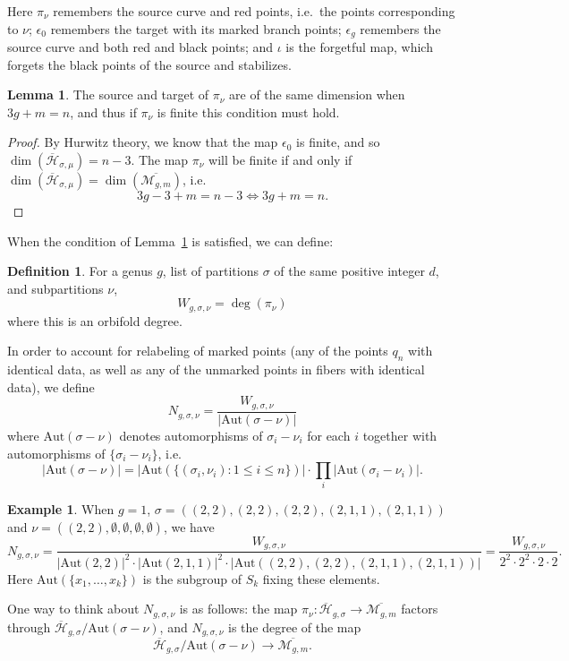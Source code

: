 \documentclass[thesis]{thesis-umich}           %
\newcommand{\Aut}{\text{Aut}}
\newcommand{\Hb}{\overline{\mathcal H}}
\theoremstyle{definition}
\newtheorem{dfn}[thm]{Definition}
\newtheorem{lem}[thm]{Lemma}
\newtheorem{eg}[thm]{Example}
\begin{document}
Here $\pi_{\nu}$ remembers the source curve and red points, i.e.\ the points corresponding to $\nu$; $\epsilon_0$ remembers the target with its marked
branch points; $\epsilon_g$ remembers the source curve and both red
and black points; and $\iota$ is the forgetful map, which forgets
the black points of the source and stabilizes.

\begin{lem}
  \label{lem:dim}
  The source and target of $\pi_{\nu}$ are of the same dimension when $3g+m=n$,
  and thus if $\pi_{\nu}$ is finite this condition must hold.
\end{lem}
\begin{proof}
  By Hurwitz theory, we know that the map $\epsilon_0$ is finite, and so $\dim(\Hb_{\sigma,\mu})=n-3$. The map $\pi_{\nu}$ will be finite if and only if
  $\dim(\Hb_{\sigma,\mu})=\dim(\overline{\mathcal M_{g,m}})$, i.e.
  \[
  3g-3+m=n-3\iff 3g+m=n.
  \]
  \end{proof}

When the condition of Lemma~\ref{lem:dim} is satisfied, we can define:
\begin{dfn}
  For a genus $g$, list of partitions $\sigma$ of the
  same positive integer $d$, and subpartitions $\nu$,
\[
W_{g,\sigma,\nu}=\deg(\pi_{\nu})
\]
where this is an orbifold degree.
\end{dfn}
In order to account for relabeling of marked points (any of the points $q_n$ with identical data, as well as any of the unmarked points in fibers with
identical data), we define
\[
N_{g,\sigma,\nu}=\frac{W_{g,\sigma,\nu}}{|\Aut(\sigma-\nu)|}
\]
where $\Aut(\sigma-\nu)$ denotes automorphisms of $\sigma_i-\nu_i$ for each $i$ together with automorphisms of $\{\sigma_i-\nu_i\}$, i.e.
\[
|\Aut(\sigma-\nu)|=|\Aut(\{(\sigma_i,\nu_i):1\leq i\leq n\})|\cdot \prod_i|\Aut(\sigma_i-\nu_i)|.
\]
\begin{eg}
  When $g=1$, $\sigma=((2,2),(2,2),(2,2),(2,1,1),(2,1,1))$ and $\nu=((2,2),\emptyset,\emptyset,\emptyset,\emptyset)$, we have
  \[
  N_{g,\sigma,\nu}=\frac{W_{g,\sigma,\nu}}{|\Aut(2,2)|^2\cdot |\Aut(2,1,1)|^2\cdot |\Aut((2,2),(2,2),(2,1,1),(2,1,1))|}=\frac{W_{g,\sigma,\nu}}{2^2\cdot 2^2\cdot 2\cdot 2}.
  \]
  Here $\Aut(\{x_1,\dots,x_k\})$ is the subgroup of $S_k$ fixing these elements.
  \end{eg}

One way to think about $N_{g,\sigma,\nu}$ is as follows: the map
$\pi_{\nu}:\Hb_{g,\sigma}\to\overline{\mathcal M_{g,m}}$ factors through
$\Hb_{g,\sigma}/\Aut(\sigma-\nu)$, and $N_{g,\sigma,\nu}$ is the degree of the map
\[
\Hb_{g,\sigma}/\Aut(\sigma-\nu)\to\overline{\mathcal M_{g,m}}.
\]
\end{document}
